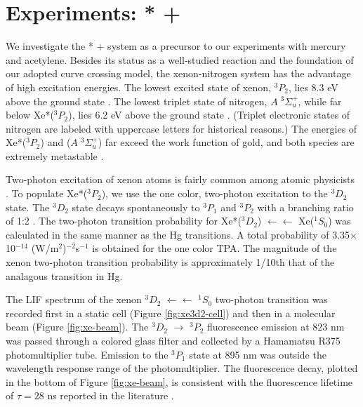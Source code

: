 \documentclass[12pt]{mitthesis}
\begin{document}
\section{Experiments: * + }

We investigate the * +  system as a precursor to our
experiments with mercury and acetylene.  Besides its status as a
well-studied reaction and the foundation of our adopted curve crossing
model, the xenon-nitrogen system has the advantage of high excitation
energies.  The lowest excited state of xenon, $^3P_2$, lies 8.3 eV
above the ground state \cite{saloman04}.  The lowest triplet state of
nitrogen, $A \; ^3\Sigma_u^+$, while far below Xe*($^3P_2$), lies 6.2
eV above the ground state \cite{lofthus77}.  (Triplet electronic
states of nitrogen are labeled with uppercase letters for historical
reasons.)  The energies of Xe*($^3P_2$) and ($A \;
^3\Sigma_u^+$) far exceed the work function of gold, and both species
are extremely metastable \cite{mishra01, lofthus77}.

Two-photon excitation of xenon atoms is fairly common among atomic
physicists \cite{alekseev96}.  To populate Xe*($^3P_2$), we use the
one color, two-photon excitation to the $^3D_2$ state.  The $^3D_2$
state decays spontaneously to $^3P_1$ and $^3P_2$ with a branching
ratio of 1:2 \cite{cabrera81}.  The two-photon transition probability
for Xe*($^3D_2$) $\leftarrow\leftarrow$ Xe($^1S_0$) was calculated in
the same manner as the Hg transitions.  A total probability of
3.35$\times$10$^{-14}$ (W/m$^2$)$^{-2}$s$^{-1}$ is obtained for the
one color TPA.  The magnitude of the xenon two-photon transition
probability is approximately 1/10th that of the analagous transition
in Hg.

The LIF spectrum of the xenon $^3D_2$ $\leftarrow\leftarrow$ $^1S_0$
two-photon transition was recorded first in a static cell (Figure
\ref{fig:xe3d2-cell}) and then in a molecular beam (Figure
\ref{fig:xe-beam}).  The $^3D_2$ $\rightarrow$ $^3P_2$ fluorescence
emission at 823 nm was passed through a colored glass filter and
collected by a Hamamatsu R375 photomultiplier tube.  Emission to the
$^3P_1$ state at 895 nm was outside the wavelength response range of
the photomultiplier.  The fluorescence decay, plotted in the bottom of
Figure \ref{fig:xe-beam}, is consistent with the fluorescence lifetime
of $\tau = 28$ ns reported in the literature \cite{cabrera81}.
\end{document}
